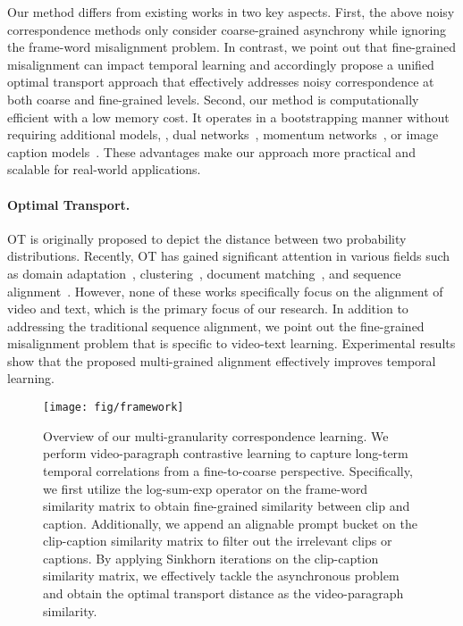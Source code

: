 Our method differs from existing works in two key aspects. First, the above noisy correspondence methods only consider coarse-grained asynchrony while ignoring the frame-word misalignment problem. In contrast, we point out that fine-grained misalignment can impact temporal learning and accordingly propose a unified optimal transport approach that effectively addresses noisy correspondence at both coarse and fine-grained levels.
Second, our method is computationally efficient with a low memory cost. It operates in a bootstrapping manner without requiring additional models, \eg, dual networks~\citep{tan}, momentum networks~\citep{albef,tan}, or image caption models~\citep{decembert}. These advantages make our approach more practical and scalable for real-world applications.

\paragraph{Optimal Transport.} OT is originally proposed to depict the distance between two probability distributions. Recently, OT has gained significant attention in various fields such as domain adaptation~\citep{xu2020reliable}, clustering~\citep{caron2020unsupervised}, document matching~\citep{yu2022optimal,kusner2015word}, and sequence alignment~\citep{su2017order,liu2022learning}. However, none of these works specifically focus on the alignment of video and text, which is the primary focus of our research. In addition to addressing the traditional sequence alignment, we point out the fine-grained misalignment problem that is specific to video-text learning. Experimental results show that the proposed multi-grained alignment effectively improves temporal learning.

\begin{figure}[t]
\centering
\texttt{[image: fig/framework]}
\caption{
Overview of our multi-granularity correspondence learning. We perform video-paragraph contrastive learning to capture long-term temporal correlations from a fine-to-coarse perspective. Specifically, we first utilize the log-sum-exp operator on the frame-word similarity matrix to obtain fine-grained similarity between clip and caption. Additionally, we append an alignable prompt bucket on the clip-caption similarity matrix to filter out the irrelevant clips or captions. By applying Sinkhorn iterations on the clip-caption similarity matrix, we effectively tackle the asynchronous problem and obtain the optimal transport distance as the video-paragraph similarity.
}
\label{fig:framework}
\end{figure}

